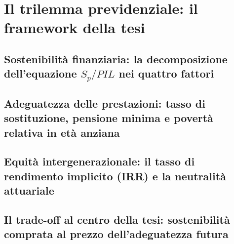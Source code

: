 \section{Il trilemma previdenziale: il framework della tesi}

    \subsection{Sostenibilità finanziaria: la decomposizione
                dell'equazione $S_p/PIL$ nei quattro fattori}
    \subsection{Adeguatezza delle prestazioni: tasso di sostituzione,
                pensione minima e povertà relativa in età anziana}
    \subsection{Equità intergenerazionale: il tasso di rendimento
                implicito (IRR) e la neutralità attuariale}
    \subsection{Il trade-off al centro della tesi: sostenibilità
                comprata al prezzo dell'adeguatezza futura}
